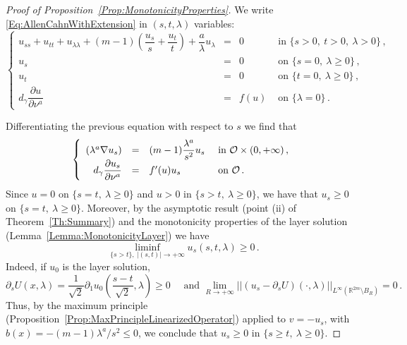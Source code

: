\documentclass[12pt,reqno]{amsart}
\theoremstyle{definition}
\theoremstyle{remark}
\newcommand{\con}[1]{\mathbb{#1}}
\newcommand{\R}{\con{R}} %
\newcommand{\ocal}{\mathcal{O}}
\newcommand{\norm}[1]{\left | \left |{#1} \right | \right |}
\newcommand{\s}{\gamma}
\newcommand{\bpar}[1]{\left ( {#1}\right )}
\newcommand\beqc[1]{\left\{\begin{array}{#1}}
\newcommand\eeqc{\end{array} \right.}
\def\PDEsystem{rcll}
\let\div\relax
\DeclareMathOperator{\div}{div}
\numberwithin{equation}{section}
\begin{document}
\begin{proof}[Proof of Proposition~\ref{Prop:MonotonicityProperties}]
We write \eqref{Eq:AllenCahnWithExtension} in $(s,t,\lambda)$ variables:
\begin{equation}
\label{Eq:AllenCahnEithExtensionST}
\beqc{\PDEsystem}
u_{ss} + u_{tt} + u_{\lambda \lambda} + (m-1)\bpar{\dfrac{u_s}{s} + \dfrac{u_t}{t}} + \dfrac{a}{\lambda} u_\lambda  & = & 0& \text{ in } \{s>0,\ t>0,\ \lambda > 0\}\,, \\
u_s & = & 0& \text{ on } \{s=0, \ \lambda \geq 0 \}\,, \\
u_t& = & 0& \text{ on } \{t=0, \ \lambda \geq 0 \}\,, \\
d_\s \dfrac{\partial u}{\partial \nu^a}& = & f(u)& \text{ on } \{\lambda = 0\}\,.
\eeqc
\end{equation}

Differentiating the previous equation with respect to $s$ we find that
$$
\beqc{\PDEsystem}
\div (\lambda^a \nabla u_s) &=& (m-1) \dfrac{\lambda^a}{s^2}u_s & \text{ in } \ocal \times (0,+\infty)\,, \\
d_\s \dfrac{\partial u_s}{\partial \nu^a}& = & f'(u)u_s& \text{ on } \ocal\,.
\eeqc
$$
Since $u = 0$ on $\{s = t,\ \lambda \geq 0 \}$ and $u>0$ in $\{s > t,\ \lambda \geq 0 \}$, we have that $u_s \geq 0$ on $\{s = t,\ \lambda \geq 0 \}$. Moreover, by the asymptotic result (point (ii) of Theorem~\ref{Th:Summary}) and the monotonicity properties of the layer solution (Lemma~\ref{Lemma:MonotonicityLayer}) we have
$$
\liminf_{\{s>t\} ,\ |(s,t)|\to +\infty} u_s(s,t,\lambda) \geq 0\,.
$$
Indeed, if $u_0$ is the layer solution, 
$$
\partial_s U (x,\lambda) = \dfrac{1}{\sqrt{2}} \partial_1 u_0\bpar{\dfrac{s-t}{\sqrt{2}}, \lambda} \geq 0 \quad \text{ and } \lim_{R\to +\infty} \norm{(u_s- \partial_s U)(\cdot,\lambda)}_{L^\infty(\R^{2m}\setminus B_{R})} = 0\,.
$$
Thus, by the maximum principle (Proposition~\ref{Prop:MaxPrincipleLinearizedOperator}) applied to $v=-u_s$, with $b(x) = -(m-1)\lambda^a / s^2\leq 0$, we conclude that $u_s \geq 0$ in $\{s \geq t,\ \lambda \geq 0\}$.


\end{proof}
\end{document}
